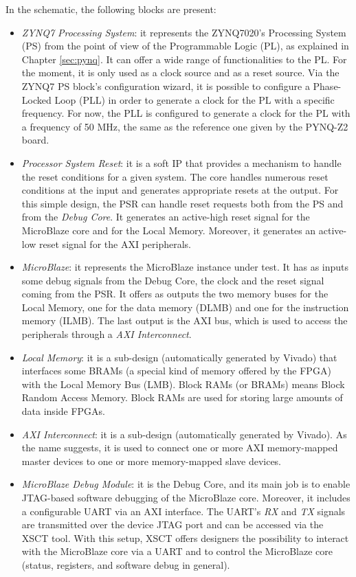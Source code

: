 In the schematic, the following blocks are present:
\begin{itemize}
    \item \textit{ZYNQ7 Processing System}: it represents the ZYNQ7020's Processing System (PS) from the point of view of the Programmable Logic (PL), as explained in Chapter \ref{sec:pynq}. It can offer a wide range of functionalities to the PL. For the moment, it is only used as a clock source and as a reset source. Via the ZYNQ7 PS block's configuration wizard, it is possible to configure a Phase-Locked Loop (PLL) in order to generate a clock for the PL with a specific frequency. For now, the PLL is configured to generate a clock for the PL with a frequency of 50 MHz, the same as the reference one given by the PYNQ-Z2 board.
    \item \textit{Processor System Reset}: it is a soft IP that provides a mechanism to handle the reset conditions for a given system. The core handles numerous reset conditions at the input and generates appropriate resets at the output. For this simple design, the PSR can handle reset requests both from the PS and from the \textit{Debug Core}. It generates an active-high reset signal for the MicroBlaze core and for the Local Memory. Moreover, it generates an active-low reset signal for the AXI peripherals. 
    \item  \textit{MicroBlaze}: it represents the MicroBlaze instance under test. It has as inputs some debug signals from the Debug Core, the clock and the reset signal coming from the PSR. It offers as outputs the two memory buses for the Local Memory, one for the data memory (DLMB) and one for the instruction memory (ILMB). The last output is the AXI bus, which is used to access the peripherals through a \textit{AXI Interconnect}.
    \item \textit{Local Memory}: it is a sub-design (automatically generated by Vivado) that interfaces some BRAMs (a special kind of memory offered by the FPGA) with the Local Memory Bus (LMB). Block RAMs (or BRAMs) means Block Random Access Memory. Block RAMs are used for storing large amounts of data inside FPGAs.
    \item \textit{AXI Interconnect}: it is a sub-design (automatically generated by Vivado). As the name suggests, it is used to connect one or more AXI memory-mapped master devices to one or more memory-mapped slave devices.
    \item \textit{MicroBlaze Debug Module}: it is the Debug Core, and its main job is to enable JTAG-based software debugging of the MicroBlaze core. Moreover, it includes a configurable UART via an AXI interface. The UART's \textit{RX} and \textit{TX} signals are transmitted over the device JTAG port and can be accessed via the XSCT tool. With this setup, XSCT offers designers the possibility to interact with the MicroBlaze core via a UART and to control the MicroBlaze core (status, registers, and software debug in general).
\end{itemize}

